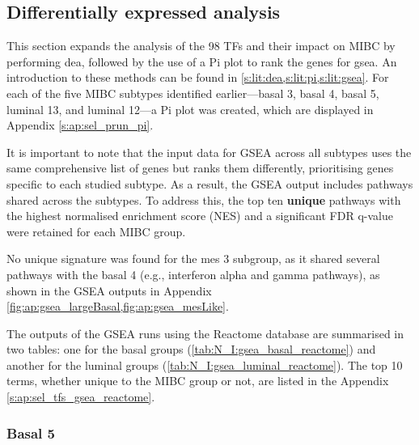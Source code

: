 \subsection{Differentially expressed analysis} \label{s:N_I:sel_tfs_subtypes}

This section expands the analysis of the 98 TFs and their impact on MIBC by performing \acrfull{dea}, followed by the use of a Pi plot to rank the genes for \acrfull{gsea}. An introduction to these methods can be found in \cref{s:lit:dea,s:lit:pi,s:lit:gsea}. For each of the five MIBC subtypes identified earlier—basal 3, basal 4, basal 5, luminal 13, and luminal 12—a Pi plot was created, which are displayed in Appendix \cref{s:ap:sel_prun_pi}. 

It is important to note that the input data for GSEA across all subtypes uses the same comprehensive list of genes but ranks them differently, prioritising genes specific to each studied subtype. As a result, the GSEA output includes pathways shared across the subtypes. To address this, the top ten \textbf{unique} pathways with the highest normalised enrichment score (NES) and a significant FDR q-value were retained for each MIBC group.

No unique signature was found for the mes 3 subgroup, as it shared several pathways with the basal 4 (e.g., interferon alpha and gamma pathways), as shown in the GSEA outputs in Appendix \cref{fig:ap:gsea_largeBasal,fig:ap:gsea_mesLike}.

The outputs of the GSEA runs using the Reactome database are summarised in two tables: one for the basal groups (\cref{tab:N_I:gsea_basal_reactome}) and another for the luminal groups (\cref{tab:N_I:gsea_luminal_reactome}). The top 10 terms, whether unique to the MIBC group or not, are listed in the Appendix \cref{s:ap:sel_tfs_gsea_reactome}.


\subsubsection*{Basal 5}


